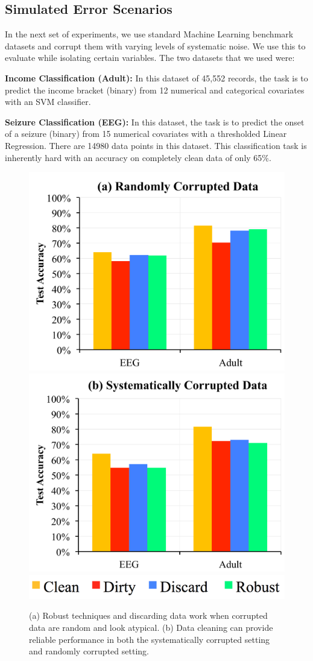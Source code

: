 \subsection{Simulated Error Scenarios}
In the next set of experiments, we use standard Machine Learning benchmark datasets and corrupt them with varying levels of systematic noise.
We use this to evaluate \sys while isolating certain variables.
The two datasets that we used were:

\vspace{0.25em}

\noindent\textbf{Income Classification (Adult): } In this dataset of 45,552 records, the task is to predict the income bracket (binary) from 12 numerical and categorical covariates with an SVM classifier. 

\vspace{0.25em}

\noindent\textbf{Seizure Classification (EEG): } In this dataset, the task is to predict the onset of a seizure (binary) from 15 numerical covariates with a thresholded Linear Regression. There are 14980 data points in this dataset. This classification task is inherently hard with an accuracy on completely clean data of only 65\%.

\begin{figure}[t]
\centering
 \includegraphics[width=0.49\columnwidth]{exp/exp2.pdf}
 \includegraphics[width=0.49\columnwidth]{exp/exp1.pdf}
 \includegraphics[width=0.5\columnwidth]{exp/legend-1.png}\vspace{-1em}
 \caption{(a) Robust techniques and discarding data work when corrupted data are random and look atypical. (b) Data cleaning can provide reliable performance in both the systematically corrupted setting and randomly corrupted setting.\label{sys-rand}}\vspace{-1.5em}
\end{figure}

